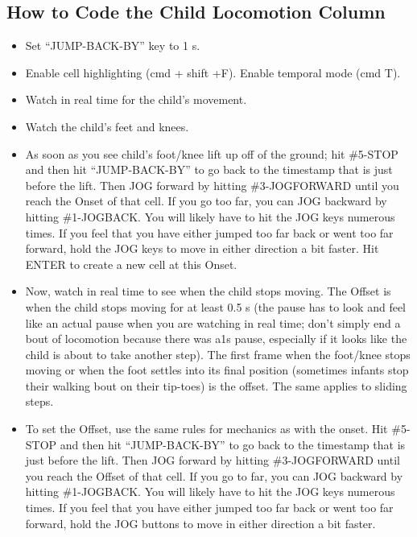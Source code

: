 \documentclass[
  12pt,
]{book}
\providecommand{\tightlist}{%
  \setlength{\itemsep}{0pt}\setlength{\parskip}{0pt}}
\begin{document}
\hypertarget{how-to-code-the-child-locomotion-column}{%
\subsection*{How to Code the Child Locomotion Column}\label{how-to-code-the-child-locomotion-column}}

\begin{itemize}
\tightlist
\item
  Set ``JUMP-BACK-BY'' key to 1 s.
\item
  Enable cell highlighting (cmd + shift +F). Enable temporal mode (cmd T).
\item
  Watch in real time for the child's movement.
\item
  Watch the child's feet and knees.
\item
  As soon as you see child's foot/knee lift up off of the ground; hit \#5-STOP and then hit ``JUMP-BACK-BY'' to go back to the timestamp that is just before the lift. Then JOG forward by hitting \#3-JOGFORWARD until you reach the Onset of that cell. If you go too far, you can JOG backward by hitting \#1-JOGBACK. You will likely have to hit the JOG keys numerous times. If you feel that you have either jumped too far back or went too far forward, hold the JOG keys to move in either direction a bit faster. Hit ENTER to create a new cell at this Onset.
\item
  Now, watch in real time to see when the child stops moving. The Offset is when the child stops moving for at least 0.5 s (the pause has to look and feel like an actual pause when you are watching in real time; don't simply end a bout of locomotion because there was a1s pause, especially if it looks like the child is about to take another step). The first frame when the foot/knee stops moving or when the foot settles into its final position (sometimes infants stop their walking bout on their tip-toes) is the offset. The same applies to sliding steps.
\item
  To set the Offset, use the same rules for mechanics as with the onset. Hit \#5-STOP and then hit ``JUMP-BACK-BY'' to go back to the timestamp that is just before the lift. Then JOG forward by hitting \#3-JOGFORWARD until you reach the Offset of that cell. If you go to far, you can JOG backward by hitting \#1-JOGBACK. You will likely have to hit the JOG keys numerous times. If you feel that you have either jumped too far back or went too far forward, hold the JOG buttons to move in either direction a bit faster.
\end{itemize}
\end{document}
